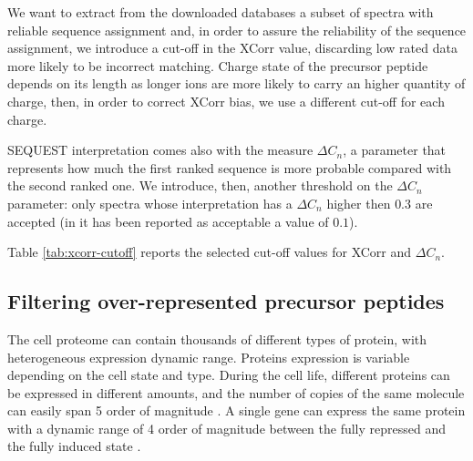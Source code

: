 We want to extract from the downloaded databases a subset of spectra with
reliable sequence assignment and,
in order to assure the reliability of the sequence assignment, we introduce a
cut-off in the XCorr value, discarding low rated data more likely to be
incorrect matching.
Charge state of the precursor peptide depends on its length as longer ions are
more likely to carry an higher quantity of charge, then, in order to correct
XCorr bias, we use a different cut-off for each charge.

SEQUEST interpretation comes also with the measure $\Delta C_n$, a parameter that
represents how much the first ranked sequence is more probable compared with the second
ranked one.
We introduce, then, another threshold on the $\Delta C_n$ parameter: only
spectra whose interpretation has a $\Delta C_n$ higher then $0.3$ are accepted
(in \cite{yates1995mining,yates1995method} it
has been reported as acceptable a value of $0.1$).

Table \ref{tab:xcorr-cutoff} reports the selected cut-off values for XCorr and
$\Delta C_n$.

\subsection{Filtering over-represented precursor peptides}

The cell proteome can contain
thousands of different types of protein, with heterogeneous expression dynamic range.
Proteins expression is variable depending on the cell state and type.
During the cell life, different proteins can be expressed in different amounts, and
the number of copies of the same molecule can easily span 5 order of magnitude
\cite{aebersold2001mass}.
A single gene can express the same protein with a dynamic range of 4 order of magnitude
between the fully repressed and the fully induced state
\cite{finley2002regulated}.

